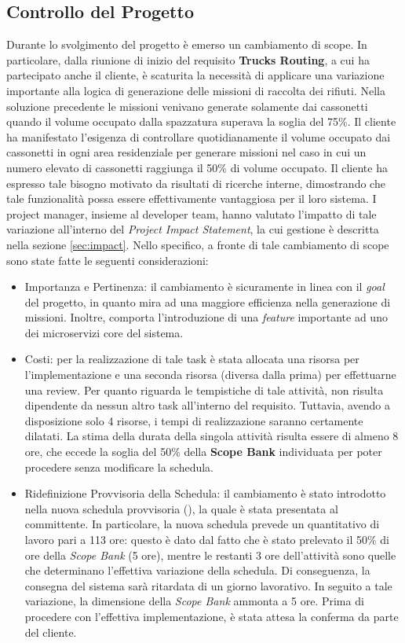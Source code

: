 \subsection{Controllo del Progetto}
Durante lo svolgimento del progetto è emerso un cambiamento di scope. In particolare, dalla riunione di inizio del requisito \textbf{Trucks Routing}, a cui ha partecipato anche il cliente, è scaturita la necessità di applicare una variazione importante alla logica di generazione delle missioni di raccolta dei rifiuti. Nella soluzione precedente le missioni venivano generate solamente dai cassonetti quando il volume occupato dalla spazzatura superava la soglia del 75\%. Il cliente ha manifestato l'esigenza di controllare quotidianamente il volume occupato dai cassonetti in ogni area residenziale per generare missioni nel caso in cui un numero elevato di cassonetti raggiunga il 50\% di volume occupato. Il cliente ha espresso tale bisogno motivato da risultati di ricerche interne, dimostrando che tale funzionalità possa essere effettivamente vantaggiosa per il loro sistema. I project manager, insieme al developer team, hanno valutato l'impatto di tale variazione all'interno del \textit{Project Impact Statement}, la cui gestione è descritta nella sezione \ref{sec:impact}. Nello specifico, a fronte di tale cambiamento di scope sono state fatte le seguenti considerazioni:
\begin{itemize}
    \item Importanza e Pertinenza: il cambiamento è sicuramente in linea con il \textit{goal} del progetto, in quanto mira ad una maggiore efficienza nella generazione di missioni. Inoltre, comporta l'introduzione di una \textit{feature} importante ad uno dei microservizi core del sistema.
    \item Costi: per la realizzazione di tale task è stata allocata una risorsa per l'implementazione e una seconda risorsa (diversa dalla prima) per effettuarne una review. Per quanto riguarda le tempistiche di tale attività, non risulta dipendente da nessun altro task all'interno del requisito. Tuttavia, avendo a disposizione solo 4 risorse, i tempi di realizzazione saranno certamente dilatati. La stima della durata della singola attività risulta essere di almeno 8 ore, che eccede la soglia del 50\% della \textbf{Scope Bank} individuata per poter procedere senza modificare la schedula.
    \item Ridefinizione Provvisoria della Schedula: il cambiamento è stato introdotto nella nuova schedula provvisoria (), la quale è stata presentata al committente. In particolare, la nuova schedula prevede un quantitativo di lavoro pari a 113 ore: questo è dato dal fatto che è stato prelevato il 50\% di ore della \textit{Scope Bank} (5 ore), mentre le restanti 3 ore dell'attività sono quelle che determinano l'effettiva variazione della schedula. Di conseguenza, la consegna del sistema sarà ritardata di un giorno lavorativo. In seguito a tale variazione, la dimensione della \textit{Scope Bank} ammonta a 5 ore. Prima di procedere con l'effettiva implementazione, è stata attesa la conferma da parte del cliente.
\end{itemize}


